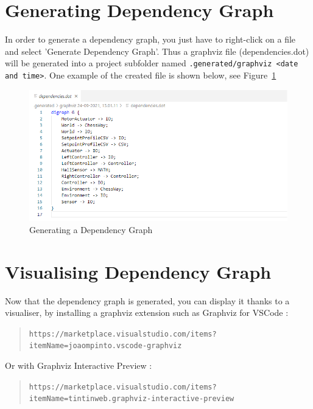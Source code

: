 \documentclass{overturerepchap}
\newcommand{\url}[1]{\texttt{#1}}
\begin{document}
\section{Generating Dependency Graph}

In order to generate a dependency graph, you just have to right-click on a file and select 'Generate Dependency Graph'. Thus a graphviz file (dependencies.dot) will be generated into a project subfolder named \texttt{.generated/graphviz <date and time>}. One example of the created file is shown below, see Figure~\ref{fig:generateDependencyGraph}

\begin{figure}[htbp]
\begin{center}
\includegraphics[width=\textwidth]{snapshots/Generation of dependency graph.png}
\caption{Generating a Dependency Graph\label{fig:generateDependencyGraph}}
\end{center}
\end{figure}

\newpage
\section{Visualising Dependency Graph}

Now that the dependency graph is generated, you can display it thanks to a visualiser, by installing a graphviz extension such as Graphviz for VSCode :
 \begin{quote}
 \url{https://marketplace.visualstudio.com/items?itemName=joaompinto.vscode-graphviz}
 \end{quote}
 
Or with Graphviz Interactive Preview :
 \begin{quote}
 \url{https://marketplace.visualstudio.com/items?itemName=tintinweb.graphviz-interactive-preview}
 \end{quote}
 
\end{document}
